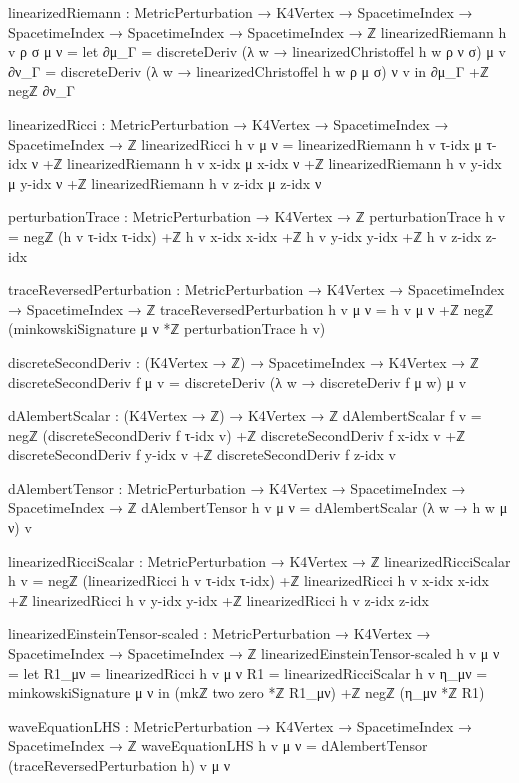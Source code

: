\documentclass[11pt,a4paper]{book}
\begin{document}
\begin{code}
linearizedRiemann : MetricPerturbation → K4Vertex → 
                    SpacetimeIndex → SpacetimeIndex → 
                    SpacetimeIndex → SpacetimeIndex → ℤ
linearizedRiemann h v ρ σ μ ν = 
  let ∂μ_Γ = discreteDeriv (λ w → linearizedChristoffel h w ρ ν σ) μ v
      ∂ν_Γ = discreteDeriv (λ w → linearizedChristoffel h w ρ μ σ) ν v
  in ∂μ_Γ +ℤ negℤ ∂ν_Γ

linearizedRicci : MetricPerturbation → K4Vertex → 
                  SpacetimeIndex → SpacetimeIndex → ℤ
linearizedRicci h v μ ν = 
  linearizedRiemann h v τ-idx μ τ-idx ν +ℤ
  linearizedRiemann h v x-idx μ x-idx ν +ℤ
  linearizedRiemann h v y-idx μ y-idx ν +ℤ
  linearizedRiemann h v z-idx μ z-idx ν

perturbationTrace : MetricPerturbation → K4Vertex → ℤ
perturbationTrace h v = 
  negℤ (h v τ-idx τ-idx) +ℤ
  h v x-idx x-idx +ℤ
  h v y-idx y-idx +ℤ
  h v z-idx z-idx

traceReversedPerturbation : MetricPerturbation → K4Vertex → 
                            SpacetimeIndex → SpacetimeIndex → ℤ
traceReversedPerturbation h v μ ν = 
  h v μ ν +ℤ negℤ (minkowskiSignature μ ν *ℤ perturbationTrace h v)

discreteSecondDeriv : (K4Vertex → ℤ) → SpacetimeIndex → K4Vertex → ℤ
discreteSecondDeriv f μ v = 
  discreteDeriv (λ w → discreteDeriv f μ w) μ v

dAlembertScalar : (K4Vertex → ℤ) → K4Vertex → ℤ
dAlembertScalar f v = 
  negℤ (discreteSecondDeriv f τ-idx v) +ℤ
  discreteSecondDeriv f x-idx v +ℤ
  discreteSecondDeriv f y-idx v +ℤ
  discreteSecondDeriv f z-idx v

dAlembertTensor : MetricPerturbation → K4Vertex → 
                  SpacetimeIndex → SpacetimeIndex → ℤ
dAlembertTensor h v μ ν = dAlembertScalar (λ w → h w μ ν) v

linearizedRicciScalar : MetricPerturbation → K4Vertex → ℤ
linearizedRicciScalar h v = 
  negℤ (linearizedRicci h v τ-idx τ-idx) +ℤ
  linearizedRicci h v x-idx x-idx +ℤ
  linearizedRicci h v y-idx y-idx +ℤ
  linearizedRicci h v z-idx z-idx

linearizedEinsteinTensor-scaled : MetricPerturbation → K4Vertex → 
                                   SpacetimeIndex → SpacetimeIndex → ℤ
linearizedEinsteinTensor-scaled h v μ ν = 
  let R1_μν = linearizedRicci h v μ ν
      R1    = linearizedRicciScalar h v
      η_μν  = minkowskiSignature μ ν
  in (mkℤ two zero *ℤ R1_μν) +ℤ negℤ (η_μν *ℤ R1)

waveEquationLHS : MetricPerturbation → K4Vertex → 
                  SpacetimeIndex → SpacetimeIndex → ℤ
waveEquationLHS h v μ ν = dAlembertTensor (traceReversedPerturbation h) v μ ν


\end{code}
\end{document}
